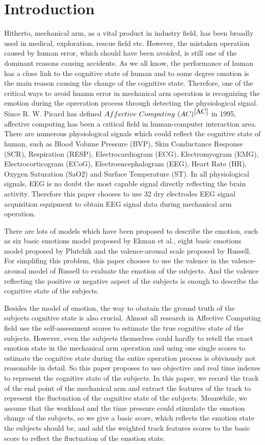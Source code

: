 \documentclass[runningheads,a4paper]{llncs}
\begin{document}
\section{Introduction}
Hitherto, mechanical arm, as a vital product in industry field, has been broadly
used in medical, exploration, rescue field etc. However, the mistaken operation
caused by human error, which should have been avoided, is still one of the
dominant reasons causing accidents. As we all know, the performance of human has a
close link to the cognitive state of human and to some degree emotion is the
main reason causing the change of the cognitive state. Therefore, one of the
critical ways to avoid huamn error in mechanical arm operation is recognizing
the emotion during the opreration process through detecting the physiological
signal. Since R. W. Picard has defined $Affective\ Computing\ (AC)^{\cite{AC}}$
in 1995, affective computing has been a critical field in human-computer
interaction area. There are numerous physiological signals which could reflect
the cognitive state of human, such as Blood Volume Pressure (BVP), Skin Conductance
Response (SCR), Respiration (RESP), Electrocardiogram (ECG), Electromyogram (EMG),
Electrocorticogram (ECoG), Electroencephalogram (EEG), Heart Rate (HR), Oxygen
Saturation (SaO2) and Surface Temperature (ST)\cite{KR}. In all physiological
signals, EEG is no doubt the most capable signal directly reflecting the brain
activity. Therefore this paper chooses to use 32 dry electrodes EEG signal acquisition
equipment to obtain EEG signal data during mechanical arm operation.


There are lots of models which have been proposed to describe the emotion, such as
six basic emotions model proposed by Ekman et al.\cite{Ekman}, eight basic emotions
model proposed by Plutchik\cite{Plutchik} and the valence-arousal scale proposed
by Russell\cite{Russell}. For simplifing this problem, this paper chooses to use the
valence in the valence-arousal model of Russell to evaluate the emotion of the subjects.
And the valence reflecting the positive or negative aspect of the subjects is enough
to describe the cognitive state of the subjects.


Besides the model of emotion, the way to obatain the ground truth of the subjects cognitive state
is also crucial. Almost all research in Affective Computing field use the self-assessment
scores to estimate the true cognitive state of the subjects. However, even the subjects
themselves could hardly to retell the exact emotion state in the mechanical arm operation
and using one single scores to estimate the cognitive state during the entire operation process
is obiviously not reasonable in detail. So this paper proposes to use objective and real time
indexes to represent the cognitive state of the subjects. In this paper, we record the track
of the end point of the mechanical arm and extract the features of the track to represent
the fluctuation of the cognitive state of the subjects. Meanwhile, we assume that the workload
and the time pressure could stimulate the emotion change of the subjects, so we give a
basic score, which reflects the emotion state the subjects should be, and add the weighted
track features scores to the basic score to reflect the fluctuation of the emotion state.
\end{document}
